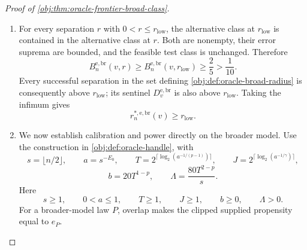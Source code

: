 \documentclass[11pt]{article}
\begin{document}
\begin{proof}[Proof of \cref{obj:thm:oracle-frontier-broad-class}]
\begin{enumerate}
The feasible test class is nonempty: the jointly measurable test
\[
\phi_0^{\mathrm e}(f',\mathcal D_n,U)=0
\qquad
\bigl(f'\in C([0,1]),\ \mathcal D_n\text{ an }n\text{-record sample},\
U\in[0,1]\bigr)
\]
has rejection expectation zero under every law. For every allowed test and every law,
\[
0\le\mathsf R_n^{\mathrm e}(P,\phi^{\mathrm e})\le1.
\]
Thus the alternative errors are bounded above by one. The positive-weight atom just obtained belongs to the alternative class at \(r_{\mathrm{low}}\), so
\[
\sup_{\substack{P\in\mathcal M_v^{\mathrm{e,br}}\\
d(P)\ge r_{\mathrm{low}}}}
\left\{1-\mathsf R_n^{\mathrm e}(P,\phi^{\mathrm e})\right\}
\ge\frac25.
\]
Taking the infimum over feasible tests in
\cref{obj:def:oracle-broad-risk} proves
\[
B_n^{\mathrm{e,br}}(v,r_{\mathrm{low}})\ge\frac25.
\]
This also proves the required error witness for the particular prior constructed above.

\item For every separation \(r\) with \(0<r\le r_{\mathrm{low}}\), the alternative class at \(r_{\mathrm{low}}\) is contained in the alternative class at \(r\). Both are nonempty, their error suprema are bounded, and the feasible test class is unchanged. Therefore
\[
B_n^{\mathrm{e,br}}(v,r)
\ge B_n^{\mathrm{e,br}}(v,r_{\mathrm{low}})
\ge\frac25>\frac1{10}.
\]
Every successful separation in the set defining
\cref{obj:def:oracle-broad-radius} is consequently above \(r_{\mathrm{low}}\); its sentinel \(D_v^{\mathrm{e,br}}\) is also above \(r_{\mathrm{low}}\). Taking the infimum gives
\[
r_n^{*,\mathrm{e,br}}(v)\ge r_{\mathrm{low}}.
\]

\item We now establish calibration and power directly on the broader model. Use the construction in \cref{obj:def:oracle-handle}, with
\[
s=\lfloor n/2\rfloor,\qquad
a=s^{-E_0},\qquad
T=2^{\lceil\log_2(a^{-1/(p-1)})\rceil},\qquad
J=2^{\lceil\log_2(a^{-1/\gamma})\rceil},
\]
\[
b=20T^{1-p},
\qquad
\Lambda=\frac{80T^{2-p}}s.
\]
Here
\[
s\ge1,\qquad 0<a\le1,\qquad T\ge1,\qquad J\ge1,\qquad
b\ge0,\qquad\Lambda>0.
\]
For a broader-model law \(P\), overlap makes the clipped supplied propensity equal to \(e_P\).


\end{enumerate}
\end{proof}
\end{document}
